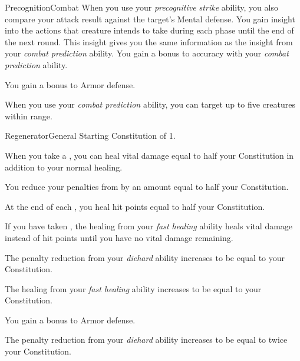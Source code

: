 \begin{feat}{Precognition}{Combat}
         When you use your \textit{precognitive strike} ability, you also compare your attack result against the target's Mental defense.
        \hit You gain insight into the actions that creature intends to take during each phase until the end of the next round.
        This insight gives you the same information as the insight from your \textit{combat prediction} ability.
        You gain a  bonus to accuracy with your \textit{combat prediction} ability.

         You gain a  bonus to Armor defense. 

         When you use your \textit{combat prediction} ability, you can target up to five creatures within range.
    \end{feat}

    \begin{feat}{Regenerator}{General}
        \featpre Starting Constitution of 1.

         When you take a , you can heal vital damage equal to half your Constitution in addition to your normal healing.

         You reduce your penalties from  by an amount equal to half your Constitution.

         At the end of each , you heal hit points equal to half your Constitution.

         If you have taken , the healing from your \textit{fast healing} ability heals vital damage instead of hit points until you have no vital damage remaining.

         The penalty reduction from your \textit{diehard} ability increases to be equal to your Constitution.

         The healing from your \textit{fast healing} ability increases to be equal to your Constitution.

         You gain a  bonus to Armor defense.

         The penalty reduction from your \textit{diehard} ability increases to be equal to twice your Constitution.
    \end{feat}

